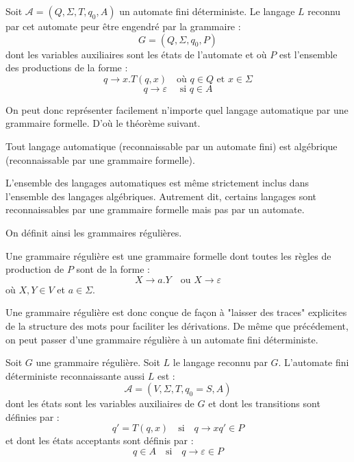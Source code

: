 \begin{prop}
    Soit $ \mathcal{A} = (Q, \Sigma, T, q_0, A)$ un automate fini déterministe. 
    Le langage $L$ reconnu par cet automate peur être engendré par la grammaire : 
        \[ G = (Q, \Sigma, q_0, P) \] 
    dont les variables auxiliaires sont les états de l'automate et où $P$ est l'ensemble 
    des productions de la forme :
        \[ q \longrightarrow x. T(q,x) \quad \text{où } q \in Q \text{ et } x \in \Sigma \] 
        \[ q \longrightarrow \varepsilon \quad \text{ si } q \in A \] 
\end{prop}

On peut donc représenter facilement n'importe quel langage automatique par une grammaire formelle. 
D'où le théorème suivant. 

\begin{theorem}
    Tout langage automatique (reconnaissable par un automate fini) est algébrique (reconnaissable par une grammaire formelle). 
    
    \vspace{0.2cm}

    L'ensemble des langages automatiques est même strictement inclus dans l'ensemble des langages algébriques. 
    Autrement dit, certains langages sont reconnaissables par une grammaire formelle mais pas par un automate. 
\end{theorem}

On définit ainsi les grammaires régulières. 

\begin{definition}
    Une grammaire régulière est une grammaire formelle dont toutes les règles de production de $P$ sont de la forme :
        \[ X \longrightarrow a.Y \quad \text{ou } X \longrightarrow \varepsilon \]
    où $X,Y \in V$ et $a \in \Sigma$.  
\end{definition}

Une grammaire régulière est donc conçue de façon à "laisser des traces" explicites de la structure des 
mots pour faciliter les dérivations. De même que précédement, on peut passer d'une grammaire régulière à un automate 
fini déterministe. 

\begin{proposition}
    Soit $G$ une grammaire régulière. Soit $L$ le langage reconnu par $G$.
    L'automate fini déterministe reconnaissante aussi $L$ est : 
        \[ \mathcal{A} = (V,\Sigma, T, q_0 = S, A) \] 
    dont les états sont les variables auxiliaires de $G$ et dont les transitions sont définies par : 
        \[ q' = T(q,x) \quad \text{si} \quad q \longrightarrow x q' \in P \] 
    et dont les états acceptants sont définis par :
        \[ q \in A \quad \text{si} \quad q \longrightarrow \varepsilon \in P \]  
\end{proposition}


